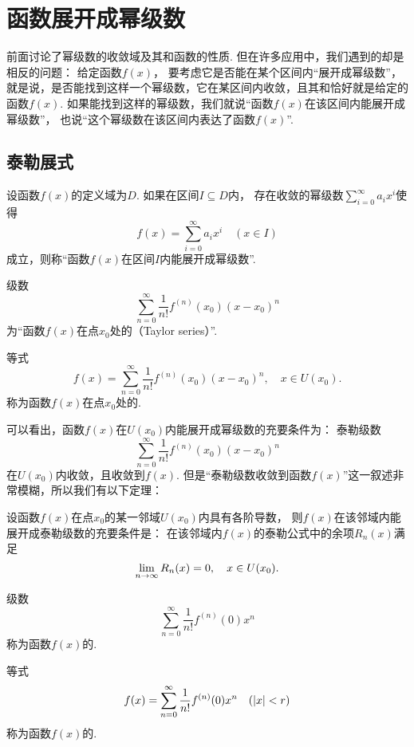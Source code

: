 \section{函数展开成幂级数}
前面讨论了幂级数的收敛域及其和函数的性质.
但在许多应用中，我们遇到的却是相反的问题：
给定函数\(f(x)\)，
要考虑它是否能在某个区间内“展开成幂级数”，
就是说，是否能找到这样一个幂级数，它在某区间内收敛，且其和恰好就是给定的函数\(f(x)\).
如果能找到这样的幂级数，我们就说“函数\(f(x)\)在该区间内能展开成幂级数”，
也说“这个幂级数在该区间内表达了函数\(f(x)\)”.

\subsection{泰勒展式}
\begin{definition}
设函数\(f(x)\)的定义域为\(D\).
如果在区间\(I \subseteq D\)内，
存在收敛的幂级数\(\sum\limits_{i=0}^\infty {a_i x^i}\)使得\[
f(x) = \sum\limits_{i=0}^\infty {a_i x^i}
\quad(x \in I)
\]成立，则称“函数\(f(x)\)在区间\(I\)内能展开成幂级数”.
\end{definition}

\begin{definition}
级数\[
\sum\limits_{n=0}^\infty \frac{1}{n!} f^{(n)}(x_0) (x-x_0)^n
\]
为“函数\(f(x)\)在点\(x_0\)处的（Taylor series）”.

等式\[
f(x) = \sum\limits_{n=0}^\infty {\frac{1}{n!} f^{(n)}(x_0) (x-x_0)^n},
\quad x \in U(x_0).
\]称为函数\(f(x)\)在点\(x_0\)处的.
\end{definition}

可以看出，函数\(f(x)\)在\(U(x_0)\)内能展开成幂级数的充要条件为：
泰勒级数\[
\sum\limits_{n=0}^\infty {\frac{1}{n!} f^{(n)}(x_0) (x-x_0)^n}
\]在\(U(x_0)\)内收敛，且收敛到\(f(x)\).
但是“泰勒级数收敛到函数\(f(x)\)”这一叙述非常模糊，所以我们有以下定理：
\begin{theorem}
设函数\(f(x)\)在点\(x_0\)的某一邻域\(U(x_0)\)内具有各阶导数，
则\(f(x)\)在该邻域内能展开成泰勒级数的充要条件是：
在该邻域内\(f(x)\)的泰勒公式中的余项\(R_n(x)\)满足\[
\lim\limits_{n\to\infty} R_n(x) = 0,
\quad x \in U(x_0).
\]
\end{theorem}

\begin{definition}
级数\[
\sum\limits_{n=0}^\infty \frac{1}{n!} f^{(n)}(0) x^n
\]称为函数\(f(x)\)的.

等式\[
f(x) = \sum\limits_{n=0}^\infty {\frac{1}{n!} f^{(n)}(0) x^n}
\quad(\abs{x} < r)
\]称为函数\(f(x)\)的.
\end{definition}

